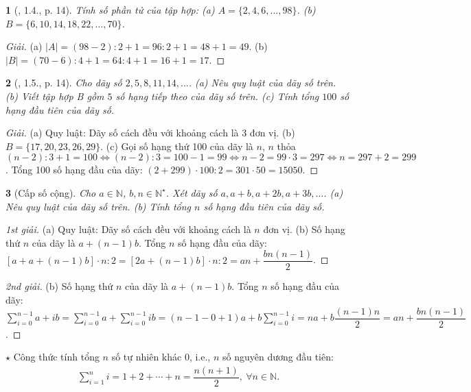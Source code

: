 \documentclass{article}
\newtheorem{baitoan}{}
\begin{document}
\begin{baitoan}[\cite{Binh_boi_duong_Toan_6_tap_1}, 1.4., p. 14]
	Tính số phần tử của tập hợp: (a) $A = \{2,4,6,\ldots,98\}$. (b) $B = \{6,10,14,18,22,\ldots,70\}$.
\end{baitoan}

\begin{proof}[Giải]
	(a) $|A| = (98 - 2):2 + 1 = 96:2 + 1 = 48 + 1 = 49$. (b) $|B| = (70 - 6):4 + 1 = 64:4 + 1 = 16 + 1 = 17$.
\end{proof}

\begin{baitoan}[\cite{Binh_boi_duong_Toan_6_tap_1}, 1.5., p. 14]
	Cho dãy số $2,5,8,11,14,\ldots$. (a) Nêu quy luật của dãy số trên. (b) Viết tập hợp B gồm $5$ số hạng tiếp theo của dãy số trên. (c) Tính tổng $100$ số hạng đầu tiên của dãy số.
\end{baitoan}

\begin{proof}[Giải]
	(a) Quy luật: Dãy số cách đều với khoảng cách là 3 đơn vị. (b) $B = \{17,20,23,26,29\}$. (c) Gọi số hạng thứ 100 của dãy là $n$, $n$ thỏa $(n - 2):3 + 1 = 100\Leftrightarrow(n - 2):3 = 100 - 1 = 99\Leftrightarrow n - 2 = 99\cdot3 = 297\Leftrightarrow n = 297 + 2 = 299$. Tổng 100 số hạng đầu của dãy: $(2 + 299)\cdot100:2 = 301\cdot50 = 15050$.
\end{proof}

\begin{baitoan}[Cấp số cộng]
	Cho $a\in\mathbb{N}$, $b,n\in\mathbb{N}^\star$. Xét dãy số $a,a + b,a + 2b,a + 3b,\ldots$. (a) Nêu quy luật của dãy số trên. (b) Tính tổng $n$ số hạng đầu tiên của dãy số.
\end{baitoan}
	
\begin{proof}[1st giải]
	(a) Quy luật: Dãy số cách đều với khoảng cách là $n$ đơn vị. (b) Số hạng thứ $n$ của dãy là $a + (n - 1)b$. Tổng $n$ số hạng đầu của dãy: $[a + a + (n - 1)b]\cdot n:2 = [2a + (n - 1)b]\cdot n:2 = an + \dfrac{bn(n - 1)}{2}$.
\end{proof}

\begin{proof}[2nd giải]
	(b) Số hạng thứ $n$ của dãy là $a + (n - 1)b$. Tổng $n$ số hạng đầu của dãy: $\sum_{i=0}^{n-1} a + ib = \sum_{i=0}^{n-1} a + \sum_{i=0}^{n-1} ib = (n - 1 - 0 + 1)a + b \sum_{i=0}^{n-1} i = na + b\dfrac{(n - 1)n}{2} = an + \dfrac{bn(n - 1)}{2}$.
\end{proof}
\noindent$\star$ \textsf{Công thức tính tổng $n$ số tự nhiên khác $0$, i.e., $n$ số nguyên dương đầu tiên}:
\begin{align*}
	\boxed{\sum_{i=1}^n i = 1 + 2 + \cdots + n = \dfrac{n(n + 1)}{2},\ \forall n\in\mathbb{N}.}
\end{align*}
\end{document}
